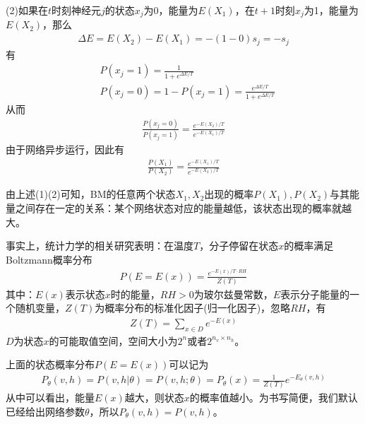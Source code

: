 {            (2)如果在$t$时刻神经元$j$的状态$x_j$为0，能量为$E(X_1)$，在$t+1$时刻$x_j$为1，能量为$E(X_2)$，那么
            \begin{align*}
            \Delta E = E(X_2)  - E(X_1) = -(1-0)s_j = -s_j
            \end{align*}
            有
            \begin{align*}
            & P(x_j = 1)  = \frac{1}{1+e^{\Delta E/T}}\\
            & P(x_j = 0) = 1-P(x_j = 1)  = \frac{e^{\Delta E/T}}{1+e^{\Delta E/T}}
            \end{align*}
            从而
            \begin{align*}
            \frac{P(x_j = 0)}{P(x_j = 1)} = \frac{e^{- E(X_2)/T}}{e^{- E(X_1)/T}}
            \end{align*}
            由于网络异步运行，因此有
            \begin{align*}
            \frac{P(X_1)}{P(X_2)} = \frac{e^{- E(X_1)/T}}{e^{- E(X_2)/T}}
            \end{align*}
            \par
            由上述(1)(2)可知，BM的任意两个状态$X_1,X_2$出现的概率$P(X_1),P(X_2)$与其能量之间存在一定的关系：某个网络状态对应的能量越低，该状态出现的概率就越大。
            \par
            事实上，统计力学的相关研究表明：在温度$T$，分子停留在状态$x$的概率满足Boltzmann概率分布
            \begin{align*}
            P(E = E(x)) = \frac{e^{-E(x)/T\cdot RH}}{Z(T)}
            \end{align*}
            其中：$E(x)$表示状态$x$时的能量，$RH>0$为玻尔兹曼常数，$E$表示分子能量的一个随机变量，$Z(T)$为概率分布的标准化因子(归一化因子)，忽略$RH$，有
            \begin{align*}
            Z(T) = \sum_{x\in D} e^{-E(x)}
            \end{align*}
            $D$为状态$x$的可能取值空间，空间大小为$2^n$或者$2^{n_v\times n_h}$。
            \par
            上面的状态概率分布$P(E = E(x))$可以记为
            \begin{align*}
            P_\theta(v,h) = P(v,h|\theta) = P(v,h;\theta) = P_\theta(x) = \frac{1}{Z(T)}e^{-E_\theta(v,h)}
            \end{align*}
            从中可以看出，能量$E(x)$越大，则状态$x$的概率值越小。为书写简便，我们默认已经给出网络参数$\theta$，所以$P_\theta(v,h) = P(v,h)$。
}
